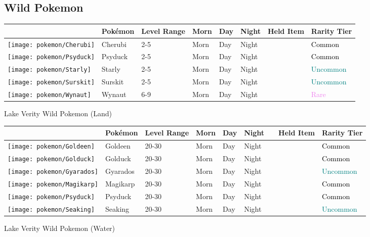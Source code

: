 \subsection{Wild Pokemon}%
\label{subsec:WildPokemon}%
\begin{longtable}{||l l l l l l l l||}%
\hline%
&Pokémon&Level Range&Morn&Day&Night&Held Item&Rarity Tier\\%
\hline%
\endhead%
\hline%
\texttt{[image: pokemon/Cherubi]}&Cherubi&2{-}5&Morn&Day&Night&&\textcolor{black}{%
Common%
}\\%
\hline%
\texttt{[image: pokemon/Psyduck]}&Psyduck&2{-}5&Morn&Day&Night&&\textcolor{black}{%
Common%
}\\%
\hline%
\texttt{[image: pokemon/Starly]}&Starly&2{-}5&Morn&Day&Night&&\textcolor{teal}{%
Uncommon%
}\\%
\hline%
\texttt{[image: pokemon/Surskit]}&Surskit&2{-}5&Morn&Day&Night&&\textcolor{teal}{%
Uncommon%
}\\%
\hline%
\texttt{[image: pokemon/Wynaut]}&Wynaut&6{-}9&Morn&Day&Night&&\textcolor{violet}{%
Rare%
}\\%
\hline%
\end{longtable}%
\caption{Lake Verity Wild Pokemon (Land)}%
\begin{longtable}{||l l l l l l l l l||}%
\hline%
&Pokémon&Level Range&Morn&Day&Night&&Held Item&Rarity Tier\\%
\hline%
\endhead%
\hline%
\texttt{[image: pokemon/Goldeen]}&Goldeen&20{-}30&Morn&Day&Night&&&\textcolor{black}{%
Common%
}\\%
\hline%
\texttt{[image: pokemon/Golduck]}&Golduck&20{-}30&Morn&Day&Night&&&\textcolor{black}{%
Common%
}\\%
\hline%
\texttt{[image: pokemon/Gyarados]}&Gyarados&20{-}30&Morn&Day&Night&&&\textcolor{teal}{%
Uncommon%
}\\%
\hline%
\texttt{[image: pokemon/Magikarp]}&Magikarp&20{-}30&Morn&Day&Night&&&\textcolor{black}{%
Common%
}\\%
\hline%
\texttt{[image: pokemon/Psyduck]}&Psyduck&20{-}30&Morn&Day&Night&&&\textcolor{black}{%
Common%
}\\%
\hline%
\texttt{[image: pokemon/Seaking]}&Seaking&20{-}30&Morn&Day&Night&&&\textcolor{teal}{%
Uncommon%
}\\%
\hline%
\end{longtable}%
\caption{Lake Verity Wild Pokemon (Water)}